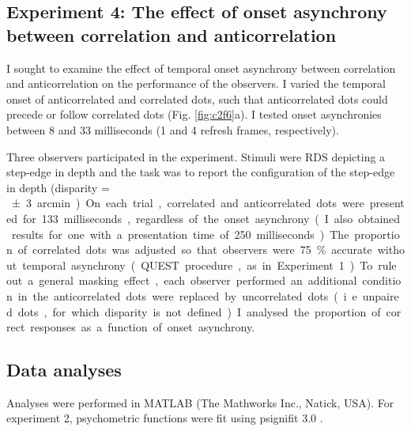 \subsection{Experiment 4: The effect of onset asynchrony between correlation and anticorrelation}
I sought to examine the effect of temporal onset asynchrony between correlation and anticorrelation on the performance of the observers. I varied the temporal onset of anticorrelated and correlated dots, such that anticorrelated dots could precede or follow correlated dots (Fig. \ref{fig:c2f6}a). I tested onset asynchronies between 8 and 33 milliseconds (1 and 4 refresh frames, respectively). 

Three observers participated in the experiment. Stimuli were RDS depicting a step-edge in depth and the task was to report the configuration of the step-edge in depth (disparity =  \SI{\pm 3} arcmin). On each trial, correlated and anticorrelated dots were presented for 133 milliseconds, regardless of the onset asynchrony (I also obtained results for one with a presentation time of 250 milliseconds). The proportion of correlated dots was adjusted so that observers were 75\% accurate without temporal asynchrony (QUEST procedure, as in Experiment 1). To rule out a general masking effect, each observer performed an additional condition in the anticorrelated dots were replaced by uncorrelated dots (i.e. unpaired dots, for which disparity is not defined). I analysed the proportion of correct responses as a function of onset asynchrony.

\subsection{Data analyses}
Analyses were performed in MATLAB (The Mathworks Inc., Natick, USA). For experiment 2, psychometric functions were fit using psignifit 3.0 \cite{Frund:2011aa}. 

